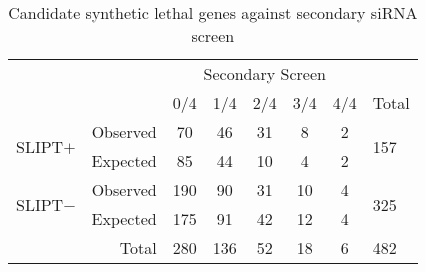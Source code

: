 \begin{table*}[!ht]
\caption{Candidate synthetic lethal genes against secondary siRNA screen}
\label{tab:secondary_screen}
\begin{center}
\begin{tabular}{rrcccccl}
                                             &                               & \multicolumn{5}{c}{Secondary Screen}                                                                                               &                                           \\ \cline{3-7}
                                             & \multicolumn{1}{r|}{}         & 0/4                      & 1/4                      & 2/4                     & 3/4                     & \multicolumn{1}{c|}{4/4} & Total                                     \\ \cline{2-8} 
\multicolumn{1}{r|}{\multirow{2}{*}{SLIPT$+$}} & \multicolumn{1}{r|}{Observed} & 70                       & 46                       & 31                      & 8                       & \multicolumn{1}{c|}{2}   & \multicolumn{1}{l|}{\multirow{2}{*}{157}} \\
\multicolumn{1}{r|}{}                        & \multicolumn{1}{r|}{Expected} & 85                       & 44                       & 10                      & 4                       & \multicolumn{1}{c|}{2}   & \multicolumn{1}{l|}{}                     \\ \cline{2-8} 
\multicolumn{1}{r|}{\multirow{2}{*}{SLIPT$-$}} & \multicolumn{1}{r|}{Observed} & 190                      & 90                       & 31                      & 10                      & \multicolumn{1}{c|}{4}   & \multicolumn{1}{l|}{\multirow{2}{*}{325}} \\
\multicolumn{1}{r|}{}                        & \multicolumn{1}{r|}{Expected} & 175                      & 91                       & 42                      & 12                      & \multicolumn{1}{c|}{4}   & \multicolumn{1}{l|}{}                     \\ \cline{2-8} 
                                             & \multicolumn{1}{r|}{Total}    & \multicolumn{1}{c}{280} & \multicolumn{1}{c}{136} & \multicolumn{1}{c}{52} & \multicolumn{1}{c}{18} & \multicolumn{1}{c|}{6}   & \multicolumn{1}{l|}{482}                  \\ \cline{3-8} 
\end{tabular}
\end{center}
\end{table*}
